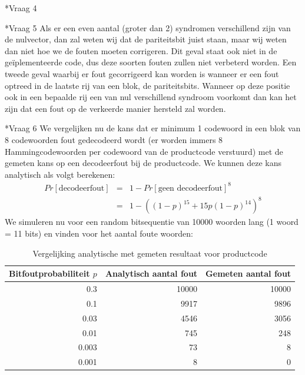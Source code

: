 \documentclass[]{article}
\begin{document}
\begin{section}
\begin{subsection}
    \end{subsection}

    \begin{subsection}*{Vraag 4} %
    \end{subsection}

    \begin{subsection}*{Vraag 5} %
    	Als er een even aantal (groter dan 2) syndromen verschillend zijn van de nulvector,
    	dan zal weten wij dat de pariteitsbit juist staan, maar wij weten dan niet hoe we
    	de fouten moeten corrigeren. Dit geval staat ook niet in de ge\"iplementeerde code,
    	dus deze soorten fouten zullen niet verbeterd worden.
    	Een tweede geval waarbij er fout gecorrigeerd kan worden is wanneer er een fout
    	optreed in de laatste rij van een blok, de pariteitsbits. Wanneer op deze positie
    	ook in een bepaalde rij een van nul verschillend syndroom voorkomt dan kan het zijn
    	dat een fout op de verkeerde manier hersteld zal worden.
    \end{subsection}

    \begin{subsection}*{Vraag 6} %
   	We vergelijken nu de kans dat er minimum 1 codewoord in een blok van 8 codewoorden fout gedecodeerd wordt (er worden immers 8 Hammingcodewoorden per codewoord van de productcode verstuurd) met de gemeten kans op een decodeerfout bij de productcode.
	We kunnen deze kans analytisch als volgt berekenen:
    	\begin{eqnarray*}
		Pr[\text{decodeerfout}]&=& 1 - Pr[\text{geen decodeerfout}]^8 \\ 
						&=& 1 - ((1-p)^{15} + 15p(1-p)^{14})^8
	\end{eqnarray*}
	We simuleren nu voor een random bitsequentie van 10000 woorden lang (1 woord = 11 bits) en vinden voor het aantal foute woorden:
	    	\begin{table}[htpb]
    		\centering	
    		\begin{tabular}{r|r|r}
    		Bitfoutprobabiliteit $p$ & Analytisch aantal fout & Gemeten aantal fout\\
    		\hline
    		0.3 & 10000 & 10000 \\
        		0.1 & 9917 & 9896\\
    		0.03 & 4546 & 3056\\
    		0.01 & 745& 248\\
    		0.003 & 73 & 8 \\
    		0.001 & 8 & 0\\		
    		\end{tabular}
    		\caption{Vergelijking analytische met gemeten resultaat voor productcode}
    	\end{table}
    \end{subsection}


\end{section}
\end{document}
